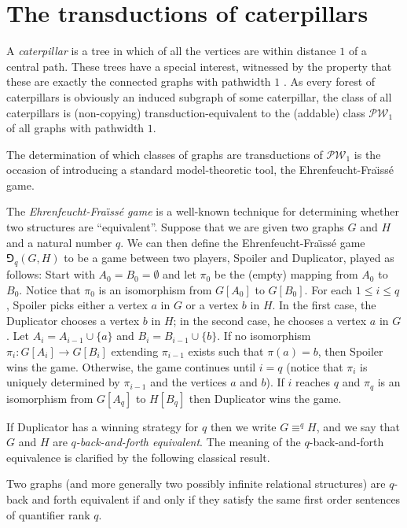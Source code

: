 \documentclass{lmcs}
\newcommand{\PW}{\mathscr{P\!W\!}}
\theoremstyle{definition}
\begin{document}
\section{The transductions of caterpillars}
A \emph{caterpillar} is a tree in which of all the vertices are within distance $1$ of a central path.
These trees have a special interest, witnessed by the property that these are exactly the connected graphs with pathwidth $1$ \cite{proskurowski1999classes}.
As every forest of caterpillars is obviously an induced subgraph of some caterpillar, the class of all caterpillars is (non-copying) transduction-equivalent to the (addable) class $\PW_1$ of all graphs with pathwidth $1$. %

The determination of which classes of graphs are transductions of $\PW_1$ is the occasion of introducing a standard model-theoretic tool, the Ehrenfeucht-Fra{\"\i}ss\'e game.

The \emph{Ehrenfeucht-Fra{\"\i}ss{\'e} game} is a well-known technique for determining whether two structures are ``equivalent''.
Suppose that we are given two graphs $G$ and $H$ and a natural number $q$. We can then define the Ehrenfeucht-Fra{\"\i}ss{\'e} game $\Game_q(G,H)$ to be a game between two players, Spoiler and Duplicator, played as follows:
Start with $A_0=B_0=\emptyset$ and let $\pi_0$ be the (empty) mapping from $A_0$ to $B_0$. Notice that $\pi_0$ is an isomorphism from $G[A_0]$ to $G[B_0]$.
For each $1\leq i\leq q$, Spoiler picks either a vertex $a$ in $G$ or a vertex $b$ in $H$.
In the first case, the Duplicator chooses a vertex $b$ in $H$; in the second case, he chooses a vertex $a$ in $G$.
Let $A_i=A_{i-1}\cup\{a\}$ and $B_i=B_{i-1}\cup\{b\}$.
If no isomorphism $\pi_i:G[A_i]\rightarrow G[B_i]$ extending $\pi_{i-1}$ exists such that $\pi(a)=b$, then Spoiler wins
the game. Otherwise, the game continues until $i=q$ (notice that $\pi_i$ is uniquely determined by $\pi_{i-1}$ and the vertices $a$ and $b$). If $i$ reaches $q$ and $\pi_q$ is an isomorphism from $G[A_q]$ to $H[B_q]$ then Duplicator wins the game.


If Duplicator has a winning strategy for $q$ then we write $G\equiv^q H$, and we
say that $G$ and $H$ are \emph{$q$-back-and-forth
	equivalent}.
The meaning of the $q$-back-and-forth equivalence is clarified by the following classical
result.

	\begin{thmC}
		Two graphs (and more generally two possibly infinite relational structures) are $q$-back and forth equivalent if and only if they satisfy the same first order sentences of quantifier rank $q$.
	\end{thmC}
\end{document}
